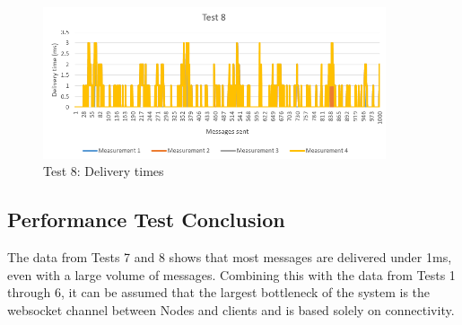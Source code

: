 \begin{figure}[!ht]
	\centering
	\includegraphics[width=0.9\textwidth]{figures/05_testing/test-perf8}
    \caption{Test 8: Delivery times}
    \label{fig:test-perf8}
\end{figure}

\subsection{Performance Test Conclusion}
The data from Tests 7 and 8 shows that most messages are delivered under 1ms, even with a large volume of messages. Combining this with the data from Tests 1 through 6, it can be assumed that the largest bottleneck of the system is the websocket channel between Nodes and clients and is based solely on connectivity.
